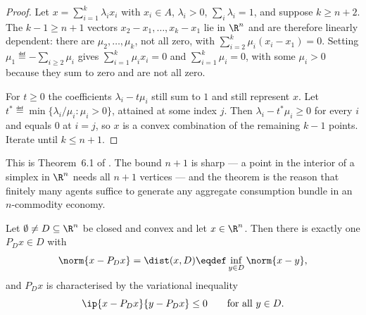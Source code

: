 \begin{proof}
	Let $x=\sum_{i=1}^{k}\lambda_ix_i$ with $x_i\in A$, $\lambda_i>0$,
	$\sum_i\lambda_i=1$, and suppose $k\geq n+2$. The $k-1\geq n+1$ vectors
	$x_2-x_1,\dots,x_k-x_1$ lie in $\R^n$ and are therefore linearly dependent:
	there are $\mu_2,\dots,\mu_k$, not all zero, with
	$\sum_{i=2}^{k}\mu_i(x_i-x_1)=0$. Setting $\mu_1\eqdef-\sum_{i\geq2}\mu_i$
	gives $\sum_{i=1}^k\mu_ix_i=0$ and $\sum_{i=1}^k\mu_i=0$, with some
	$\mu_i>0$ because they sum to zero and are not all zero.

	For $t\geq0$ the coefficients $\lambda_i-t\mu_i$ still sum to $1$ and still
	represent $x$. Let
	$t^\ast\eqdef\min\{\lambda_i/\mu_i : \mu_i>0\}$, attained at some index $j$. Then
	$\lambda_i-t^\ast\mu_i\geq0$ for every $i$ and equals $0$ at $i=j$, so $x$ is a
	convex combination of the remaining $k-1$ points. Iterate until $k\leq n+1$.
\end{proof}

This is Theorem~6.1 of \textcite[p.~190]{fukuda2026notes}. The bound $n+1$ is
sharp --- a point in the interior of a simplex in $\R^n$ needs all $n+1$
vertices --- and the theorem is the reason that finitely many agents suffice to
generate any aggregate consumption bundle in an $n$-commodity economy.

\begin{lemma}\label{lem:nearest-point}
	Let $\emptyset\neq D\subseteq\R^n$ be closed and convex and let $x\in\R^n$.
	Then there is exactly one $P_Dx\in D$ with
	\[
		\norm{x-P_Dx}=\dist(x,D)\eqdef\inf_{y\in D}\norm{x-y},
	\]
	and $P_Dx$ is characterised by the variational inequality
	\begin{equation}\label{eq:variational-inequality}
		\ip{x-P_Dx}{y-P_Dx}\leq0\qquad\text{for all }y\in D .
	\end{equation}
\end{lemma}

